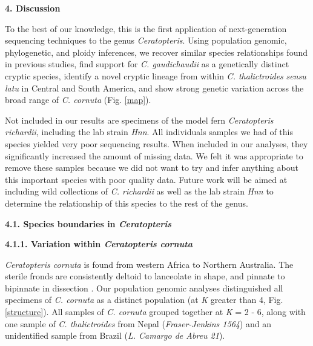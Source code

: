 \documentclass[12pt]{article}
\begin{document}
\begin{flushleft}
\vspace{1cm}

{\large\textbf{4. Discussion}}

To the best of our knowledge, this is the first application of next-generation sequencing techniques to the genus \textit{Ceratopteris}. Using population genomic, phylogenetic, and ploidy inferences, we recover similar species relationships found in previous studies, find support for \textit{C. gaudichaudii} as a genetically distinct cryptic species, identify a novel cryptic lineage from within \textit{C. thalictroides} \textit{sensu latu} in Central and South America, and show strong genetic variation across the broad range of \textit{C. cornuta} (Fig. \ref{map}).

Not included in our results are specimens of the model fern \textit{Ceratopteris richardii}, including the lab strain \textit{Hnn}. All individuals samples we had of this species yielded very poor sequencing results. When included in our analyses, they significantly increased the amount of missing data. We felt it was appropriate to remove these samples because we did not want to try and infer anything about this important species with poor quality data. Future work will be aimed at including wild collections of \textit{C. richardii} as well as the lab strain \textit{Hnn} to determine the relationship of this species to the rest of the genus.

\textbf{4.1. Species boundaries in \textit{Ceratopteris}} 

\textbf{4.1.1. Variation within \textit{Ceratopteris cornuta}}

\textit{Ceratopteris cornuta} is found from western Africa to Northern Australia. The sterile fronds are consistently deltoid to lanceolate in shape, and pinnate to bipinnate in dissection \autocite{LloydTax1974}. Our population genomic analyses distinguished all specimens of \textit{C. cornuta} as a distinct population (at \textit{K} greater than 4, Fig. \ref{structure}). All samples of \textit{C. cornuta} grouped together at \textit{K} = 2 - 6, along with one sample of \textit{C. thalictroides} from Nepal (\textit{Fraser-Jenkins 1564}) and an unidentified sample from Brazil (\textit{L. Camargo de Abreu 21}). 


\end{flushleft}
\end{document}
